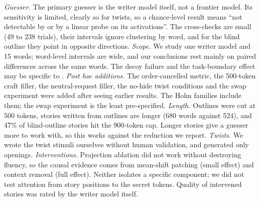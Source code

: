 \emph{Guesser.} The primary guesser is the writer model itself, not a frontier model.
Its sensitivity is limited, clearly so for twists, so a chance-level result means ``not detectable by \gemma or by a linear probe on its activations''.
The cross-checks are small (49 to 238 trials), their intervals ignore clustering by word, and for the blind outline they point in opposite directions.
\emph{Scope.} We study one writer model and 15 words; word-level intervals are wide, and our conclusions rest mainly on paired differences across the same words.
The decoy failure and the task-boundary effect may be specific to \gemma.
\emph{Post hoc additions.} The order-cancelled metric, the 500-token craft filler, the neutral-request filler, the no-hide twist conditions and the swap experiment were added after seeing earlier results.
The Holm families include them; the swap experiment is the least pre-specified.
\emph{Length.} Outlines were cut at 500 tokens, stories written from outlines are longer (680 words against 524), and 47\% of blind-outline stories hit the 900-token cap.
Longer stories give a guesser more to work with, so this works against the reduction we report.
\emph{Twists.} We wrote the twist stimuli ourselves without human validation, and generated only openings.
\emph{Interventions.} Projection ablation did not work without destroying fluency, so the causal evidence comes from mean-shift patching (small effect) and context removal (full effect).
Neither isolates a specific component; we did not test attention from story positions to the secret tokens.
Quality of intervened stories was rated by the writer model itself.
